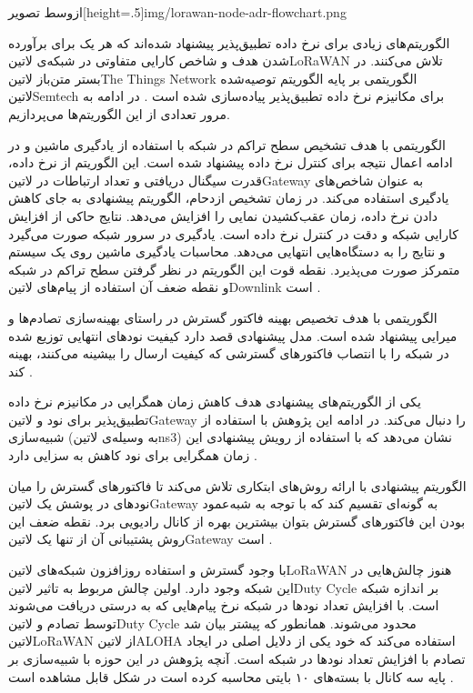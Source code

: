 ‌ازوسط
‌تصویر[height=.5\textwidth]{img/lorawan-node-adr-flowchart.png}

الگوریتم‌های زیادی برای نرخ داده تطبیق‌پذیر پیشنهاد شده‌اند که هر یک برای برآورده شدن هدف و شاخص کارایی متفاوتی در شبکه‌ی ‌لاتین{LoRaWAN}
تلاش می‌کنند.
در بستر متن‌باز ‌لاتین{The Things Network}
الگوریتمی بر پایه الگوریتم توصیه‌شده ‌لاتین{Semtech} برای مکانیزم نرخ داده تطبیق‌پذیر پیاده‌سازی شده است
. در ادامه به مرور تعدادی از این الگوریتم‌ها می‌پردازیم.

الگوریتمی با هدف تشخیص سطح تراکم در شبکه با استفاده از یادگیری ماشین و در ادامه اعمال نتیجه برای کنترل نرخ داده پیشنهاد شده است.
این الگوریتم از نرخ داده، قدرت سیگنال دریافتی و تعداد ارتباطات در ‌لاتین{Gateway} به عنوان شاخص‌های یادگیری استفاده می‌کند.
در زمان تشخیص ازدحام، الگوریتم پیشنهادی به جای کاهش دادن نرخ داده، زمان عقب‌کشیدن نمایی را افزایش می‌دهد.
نتایج حاکی از افزایش کارایی شبکه و دقت در کنترل نرخ داده است. یادگیری در سرور شبکه صورت می‌گیرد و نتایج را به دستگاه‌هایی انتهایی می‌دهد.
محاسبات یادگیری ماشین روی یک سیستم متمرکز صورت می‌پذیرد. نقطه قوت این الگوریتم در نظر گرفتن سطح تراکم در شبکه و نقطه ضعف آن استفاده
از پیام‌های ‌لاتین{Downlink} است
.

الگوریتمی با هدف تخصیص بهینه فاکتور گسترش در راستای بهینه‌سازی تصادم‌ها و میرایی پیشنهاد شده است.
مدل پیشنهادی قصد دارد کیفیت نودهای انتهایی توزیع شده در شبکه را با انتصاب فاکتورهای گسترشی که کیفیت ارسال را بیشینه می‌کنند، بهینه کند
.

یکی از الگوریتم‌های پیشنهادی هدف کاهش زمان همگرایی در مکانیزم نرخ داده تطبیق‌پذیر برای نود و ‌لاتین{Gateway} را دنبال می‌کند.
در ادامه این پژوهش با استفاده از شبیه‌سازی (به وسیله‌ی ‌لاتین{ns3}) نشان می‌دهد که با استفاده از رویش پیشنهادی این زمان همگرایی برای نود کاهش به سزایی دارد
.

الگوریتم پیشنهادی با ارائه روش‌های ابتکاری تلاش می‌کند تا فاکتورهای گسترش را میان نودهای در پوشش یک ‌لاتین{Gateway} به گونه‌ای تقسیم کند
که با توجه به شبه‌عمود بودن این فاکتورهای گسترش بتوان بیشترین بهره از کانال رادیویی برد. نقطه ضعف این روش پشتیبانی آن از تنها یک ‌لاتین{Gateway}
است
.


با وجود گسترش و استفاده روزافزون شبکه‌های ‌لاتین{LoRaWAN} هنوز چالش‌هایی در این شبکه وجود دارد. اولین چالش مربوط به تاثیر
‌لاتین{Duty Cycle} بر اندازه شبکه است. با افزایش تعداد نودها در شبکه نرخ پیام‌هایی که به درستی دریافت می‌شوند توسط تصادم و
‌لاتین{Duty Cycle} محدود می‌شوند. همانطور که پیشتر بیان شد ‌لاتین{LoRaWAN} از ‌لاتین{ALOHA} استفاده می‌کند
که خود یکی از دلایل اصلی در ایجاد تصادم با افزایش تعداد نودها در شبکه است. آنچه پژوهش  در این حوزه
با شبیه‌سازی بر پایه سه کانال با بسته‌های ۱۰ بایتی محاسبه کرده است در شکل  قابل مشاهده است
.

